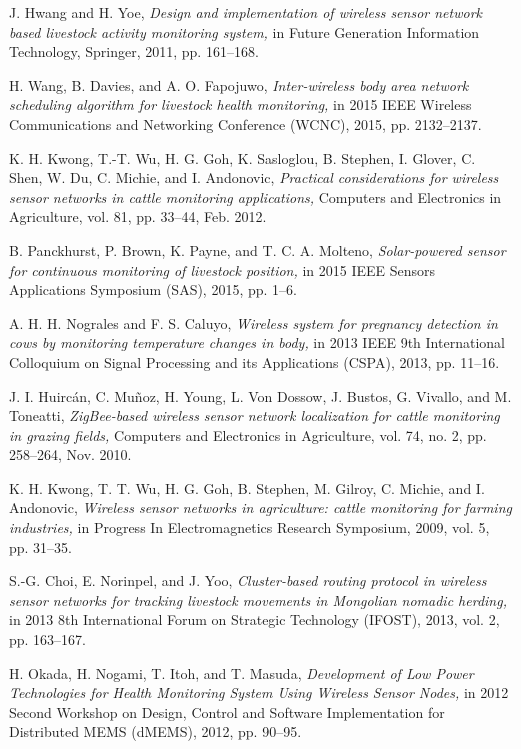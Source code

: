 \documentclass[conference]{IEEEtran}
\begin{document}
\begin{thebibliography}{1}
J. Hwang and H. Yoe, \emph{Design and implementation of wireless sensor network based livestock activity monitoring system,} in Future Generation Information Technology, Springer, 2011, pp. 161–168.

H. Wang, B. Davies, and A. O. Fapojuwo, \emph{Inter-wireless body area network scheduling algorithm for livestock health monitoring,} in 2015 IEEE Wireless Communications and Networking Conference (WCNC), 2015, pp. 2132–2137.

K. H. Kwong, T.-T. Wu, H. G. Goh, K. Sasloglou, B. Stephen, I. Glover, C. Shen, W. Du, C. Michie, and I. Andonovic, \emph{Practical considerations for wireless sensor networks in cattle monitoring applications,} Computers and Electronics in Agriculture, vol. 81, pp. 33–44, Feb. 2012.

B. Panckhurst, P. Brown, K. Payne, and T. C. A. Molteno, \emph{Solar-powered sensor for continuous monitoring of livestock position,} in 2015 IEEE Sensors Applications Symposium (SAS), 2015, pp. 1–6.

A. H. H. Nograles and F. S. Caluyo, \emph{Wireless system for pregnancy detection in cows by monitoring temperature changes in body,} in 2013 IEEE 9th International Colloquium on Signal Processing and its Applications (CSPA), 2013, pp. 11–16.

J. I. Huircán, C. Muñoz, H. Young, L. Von Dossow, J. Bustos, G. Vivallo, and M. Toneatti, \emph{ZigBee-based wireless sensor network localization for cattle monitoring in grazing fields,} Computers and Electronics in Agriculture, vol. 74, no. 2, pp. 258–264, Nov. 2010.

K. H. Kwong, T. T. Wu, H. G. Goh, B. Stephen, M. Gilroy, C. Michie, and I. Andonovic, \emph{Wireless sensor networks in agriculture: cattle monitoring for farming industries,} in Progress In Electromagnetics Research Symposium, 2009, vol. 5, pp. 31–35.

S.-G. Choi, E. Norinpel, and J. Yoo, \emph{Cluster-based routing protocol in wireless sensor networks for tracking livestock movements in Mongolian nomadic herding,} in 2013 8th International Forum on Strategic Technology (IFOST), 2013, vol. 2, pp. 163–167.

H. Okada, H. Nogami, T. Itoh, and T. Masuda, \emph{Development of Low Power Technologies for Health Monitoring System Using Wireless Sensor Nodes,} in 2012 Second Workshop on Design, Control and Software Implementation for Distributed MEMS (dMEMS), 2012, pp. 90–95.


\end{thebibliography}
\end{document}
